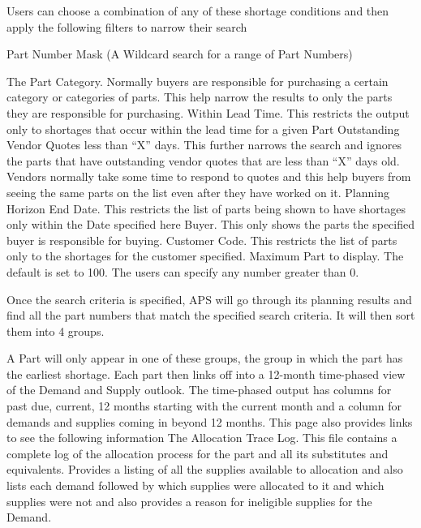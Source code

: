 \documentclass[letterpaper,10pt,english]{sphinxmanual}
\begin{document}
Users can choose a combination of any of these shortage conditions and
then apply the following filters to narrow their search

Part Number Mask (A Wildcard search for a range of Part Numbers)

The Part Category. Normally buyers are responsible for purchasing a
certain category or categories of parts. This help narrow the results to
only the parts they are responsible for purchasing. Within Lead Time.
This restricts the output only to shortages that occur within the lead
time for a given Part Outstanding Vendor Quotes less than “X” days. This
further narrows the search and ignores the parts that have outstanding
vendor quotes that are less than “X” days old. Vendors normally take
some time to respond to quotes and this help buyers from seeing the same
parts on the list even after they have worked on it. Planning Horizon
End Date. This restricts the list of parts being shown to have shortages
only within the Date specified here Buyer. This only shows the parts the
specified buyer is responsible for buying. Customer Code. This restricts
the list of parts only to the shortages for the customer specified.
Maximum Part to display. The default is set to 100. The users can
specify any number greater than 0.

Once the search criteria is specified, APS will go through its planning
results and find all the part numbers that match the specified search
criteria. It will then sort them into 4 groups.

A Part will only appear in one of these groups, the group in which the
part has the earliest shortage. Each part then links off into a 12-month
time-phased view of the Demand and Supply outlook. The time-phased
output has columns for past due, current, 12 months starting with the
current month and a column for demands and supplies coming in beyond 12
months. This page also provides links to see the following information
The Allocation Trace Log. This file contains a complete log of the
allocation process for the part and all its substitutes and equivalents.
Provides a listing of all the supplies available to allocation and also
lists each demand followed by which supplies were allocated to it and
which supplies were not and also provides a reason for ineligible
supplies for the Demand.
\end{document}
